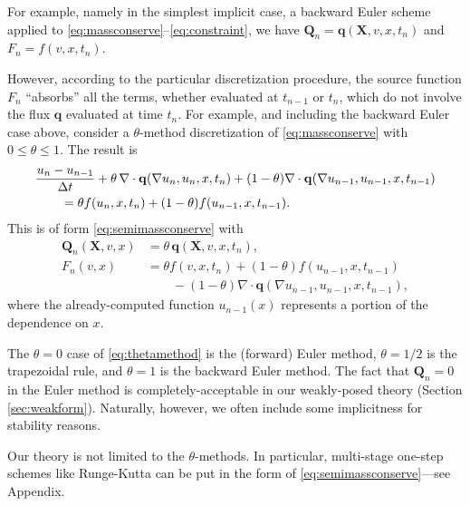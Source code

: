 \documentclass[final,leqno,onefignum,onetabnum]{siamltex1213bueler}
\newcommand\bq{\mathbf{q}}
\newcommand\bQ{\mathbf{Q}}
\newcommand\bX{\mathbf{X}}
\newcommand{\Div}{\nabla\cdot}
\renewcommand{\grad}{\nabla}
\begin{document}
For example, namely in the simplest implicit case, a backward Euler scheme applied to \eqref{eq:massconserve}--\eqref{eq:constraint}, we have $\bQ_n = \bq(\bX,v,x,t_n)$ and $F_n = f(v,x,t_n)$.

However, according to the particular discretization procedure, the source function $F_n$ ``absorbs'' all the terms, whether evaluated at $t_{n-1}$ or $t_n$, which do not involve the flux $\bq$ evaluated at time $t_n$.  For example, and including the backward Euler case above, consider a $\theta$-method discretization of \eqref{eq:massconserve} with $0\le \theta \le 1$.  The result is
\begin{align}
  &\frac{u_n - u_{n-1}}{\Delta t} + \theta\, \Div \bq(\grad u_n,u_n,x,t_n) + (1-\theta) \Div \bq(\grad u_{n-1},u_{n-1},x,t_{n-1}) \label{eq:thetamethod} \\
  &\qquad =  \theta f(u_n,x,t_n) + (1-\theta) f(u_{n-1},x,t_{n-1}). \notag
\end{align}
This is of form \eqref{eq:semimassconserve} with
\begin{align*}
\bQ_n(\bX,v,x) &= \theta\, \bq(\bX,v,x,t_n), \\
F_n(v,x)       &= \theta f(v,x,t_n) + (1-\theta) f(u_{n-1},x,t_{n-1}) \\
               &\qquad - (1-\theta) \Div \bq(\grad u_{n-1},u_{n-1},x,t_{n-1}),
\end{align*}
where the already-computed function $u_{n-1}(x)$ represents a portion of the dependence on $x$.

The $\theta=0$ case of \eqref{eq:thetamethod} is the (forward) Euler method, $\theta=1/2$ is the trapezoidal rule, and $\theta=1$ is the backward Euler method.  The fact that $\bQ_n=0$ in the Euler method is completely-acceptable in our weakly-posed theory (Section \ref{sec:weakform}).  Naturally, however, we often include some implicitness for stability reasons.

Our theory is not limited to the $\theta$-methods.  In particular, multi-stage one-step schemes like Runge-Kutta can be put in the form of \eqref{eq:semimassconserve}---see Appendix.
\end{document}
